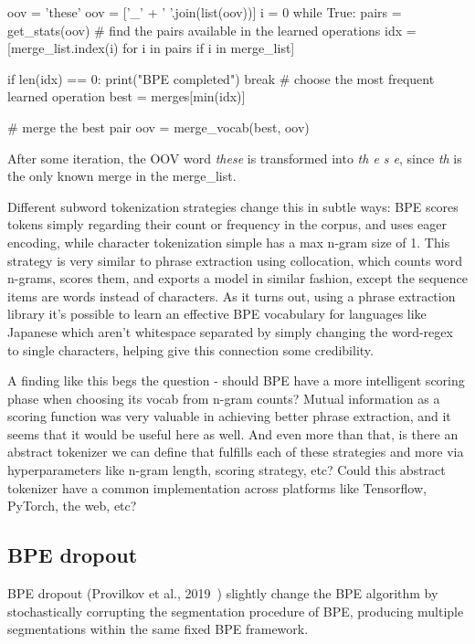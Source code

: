 \begin{python}
oov = 'these'
oov = ['_' + ' '.join(list(oov))]
i = 0
while True:
    pairs = get_stats(oov)
    # find the pairs available in the learned operations
    idx = [merge_list.index(i) for i in pairs if i in merge_list]

    if len(idx) == 0:
        print("BPE completed")
        break
    # choose the most frequent learned operation
    best = merges[min(idx)]

    # merge the best pair
    oov = merge_vocab(best, oov)
\end{python}

After some iteration, the OOV word \emph{these} is transformed into \emph{th e s e}, since \emph{th} is the only known merge in the merge\_list.

Different subword tokenization strategies change this in subtle ways: BPE scores tokens simply regarding their count or frequency in the corpus, and uses eager encoding, while character tokenization simple has a max n-gram size of 1. This strategy is very similar to phrase extraction using collocation, which counts word n-grams, scores them, and exports a model in similar fashion, except the sequence items are words instead of characters. As it turns out, using a phrase extraction library it's possible to learn an effective BPE vocabulary for languages like Japanese which aren't whitespace separated by simply changing the word-regex to single characters, helping give this connection some credibility.

A finding like this begs the question - should BPE have a more intelligent scoring phase when choosing its vocab from n-gram counts? Mutual information as a scoring function was very valuable in achieving better phrase extraction, and it seems that it would be useful here as well. And even more than that, is there an abstract tokenizer we can define that fulfills each of these strategies and more via hyperparameters like n-gram length, scoring strategy, etc? Could this abstract tokenizer have a common implementation across platforms like Tensorflow, PyTorch, the web, etc?

\subsection{BPE dropout}

BPE dropout (Provilkov et al., 2019~\cite{provilkov2019bpedropout}) slightly change the BPE algorithm by stochastically corrupting the segmentation procedure of BPE, producing multiple segmentations within the same fixed BPE framework.

